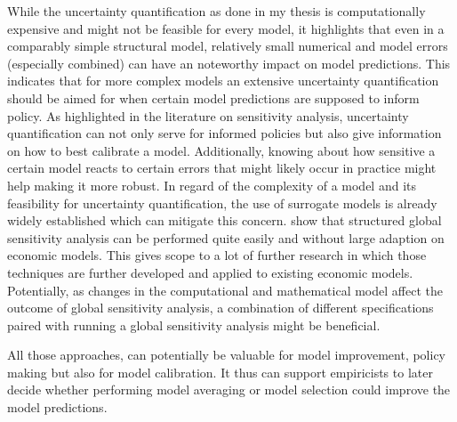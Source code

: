 While the uncertainty quantification as done in my thesis is computationally expensive and might not be feasible for every model, it highlights that even in a comparably simple structural model, relatively small numerical and model errors (especially combined) can have an noteworthy impact on model predictions. This indicates that for more complex models an extensive uncertainty quantification should be aimed for when certain model predictions are supposed to inform policy. As highlighted in the literature on sensitivity analysis, uncertainty quantification can not only serve for informed policies but also give information on how to best calibrate a model. Additionally, knowing about how sensitive a certain model reacts to certain errors that might likely occur in practice might help making it more robust. In regard of the complexity of a model and its feasibility for uncertainty quantification, the use of surrogate models is already widely established which can mitigate this concern. \cite{Harenberg.2019} show that structured global sensitivity analysis can be performed quite easily and without large adaption on economic models. This gives scope to a lot of further research in which those techniques are further developed and applied to existing economic models. Potentially, as changes in the computational and mathematical model affect the outcome of global sensitivity analysis, a combination of different specifications paired with running a global sensitivity analysis might be beneficial.

All those approaches, can potentially be valuable for model improvement, policy making but also for model calibration. It thus can support empiricists to later decide whether performing model averaging or model selection could improve the model predictions.
